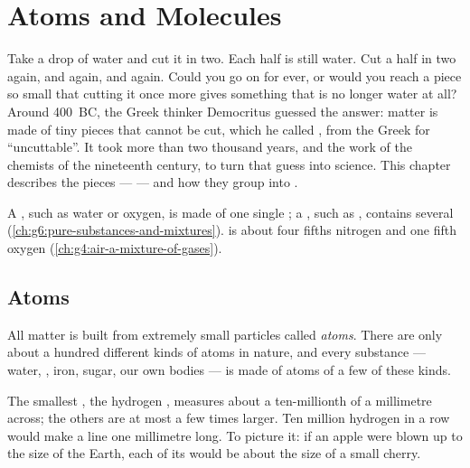\chapter{Atoms and Molecules}\label{ch:g7:atoms-and-molecules}

Take a drop of water and cut it in two. Each half is still water. Cut a
half in two again, and again, and again. Could you go on for ever, or
would you reach a piece so small that cutting it once more gives
something that is no longer water at all? Around 400~BC, the Greek
thinker Democritus guessed the answer: matter is made of tiny pieces
that cannot be cut, which he called \emph{}, from the Greek for
``uncuttable''. It took more than two thousand years, and the work of
the chemists of the nineteenth century, to turn that guess into
science. This chapter describes the pieces ---  --- and how they
group into .

\begin{recall}
A , such as water or oxygen, is made of one single
; a , such as , contains several
(\cref{ch:g6:pure-substances-and-mixtures}).  is about four fifths
nitrogen and one fifth oxygen (\cref{ch:g4:air-a-mixture-of-gases}).
\end{recall}

\section{Atoms}

\begin{definition}[Atom]\label{def:g7:atoms-and-molecules:atom}
All matter is built from extremely small particles called
\emph{atoms}. There are only about a hundred different
kinds of atoms in nature, and every substance --- water, , iron,
sugar, our own bodies --- is made of atoms of a few of these kinds.
\end{definition}

\begin{proposition}\label{prop:g7:atoms-and-molecules:tiny}
The smallest , the hydrogen , measures about a ten-millionth of
a millimetre across; the others are at most a few times larger. Ten
million hydrogen  in a row would make a line one millimetre long.
To picture it: if an apple were blown up to the size of the Earth, each
of its  would be about the size of a small cherry.
\end{proposition}

